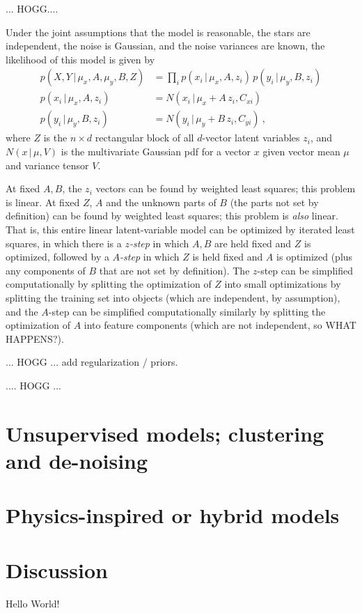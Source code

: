 \documentclass[modern]{aastex631}
\newcommand{\given}{\,|\,}
\begin{document}
  ... HOGG....

Under the joint assumptions that the model is reasonable, the stars are independent, the noise is Gaussian, and the noise variances are known, the likelihood of this model is given by
\begin{align}
  p(X, Y\given \mu_x, A, \mu_y, B, Z) &= \prod_i p(x_i\given \mu_x, A, z_i)\,p(y_i\given \mu_y, B, z_i) \\
  p(x_i\given \mu_x, A, z_i) &= N(x_i\given \mu_x + A\,z_i, C_{xi}) \\
  p(y_i\given \mu_y, B, z_i) &= N(y_i\given \mu_y + B\,z_i, C_{yi}) ~,
\end{align}
where $Z$ is the $n\times d$ rectangular block of all $d$-vector latent variables $z_i$,
and $N(x\given\mu,V)$ is the multivariate Gaussian pdf for a vector $x$ given vector mean $\mu$ and variance tensor $V$.

At fixed $A, B$, the $z_i$ vectors can be found by weighted least squares; this problem is linear.
At fixed $Z$, $A$ and the unknown parts of $B$ (the parts not set by definition) can be found by weighted least squares; this problem is \emph{also} linear.
That is, this entire linear latent-variable model can be optimized by iterated least squares, in which there is a \emph{$z$-step} in which $A, B$ are held fixed and $Z$ is optimized, followed by a \emph{$A$-step} in which $Z$ is held fixed and $A$ is optimized (plus any components of $B$ that are not set by definition).
The $z$-step can be simplified computationally by splitting the optimization of $Z$ into small optimizations by splitting the training set into objects (which are independent, by assumption), and the $A$-step can be simplified computationally similarly by splitting the optimization of $A$ into feature components (which are not independent, so WHAT HAPPENS?).

... HOGG ... add regularization / priors.

.... HOGG ...

\section{Unsupervised models; clustering and de-noising}

\section{Physics-inspired or hybrid models}

\section{Discussion}

Hello World!

{}

\end{document}
